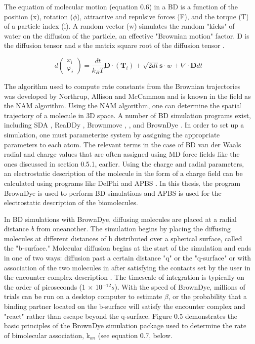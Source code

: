 \documentclass[12pt]{ucsddissertation}
\begin{document}
\begin{dissertationintroduction}
The equation of molecular motion (equation 0.6) in a BD is a function of the position (x), rotation ($\phi$), attractive and repulsive forces (F), and the torque (T) of a particle index (i). A random vector (w) simulates the random "kicks" of water on the diffusion of the particle, an effective "Brownian motion" factor. D is the diffusion tensor and s the matrix square root of the diffusion tensor \cite{Huber2010}. 

\begin{equation}
    d \left( \begin{array} { c } { x _ { i } } \\ { \varphi _ { i } } \end{array} \right) = \frac { d t } { k _ { B } T } \mathbf { D } \cdot \left( \mathbf { T } _ { i } \right) + \sqrt { 2 d t } \mathbf { s } \cdot w + \nabla \cdot \mathbf { D } d t
\end{equation}

The algorithm used to compute rate constants from the Brownian trajectories was developed by Northrup, Allison and McCammon \cite{Northrup1984} and is known in the field as the NAM algorithm. Using the NAM algorithm, one can determine the spatial trajectory of a molecule in 3D space. A number of BD simulation programs exist, including SDA \cite{Gabdoulline1997,Gabdoulline1998}, ReaDDy \cite{Schoneberg2013}, Brownmove \cite{Geyer2011},  \cite{Dlugosz2011}, and  BrownDye \cite{Huber2010}. In order to set up a simulation, one must parameterize system by assigning the appropriate parameters to each atom. The relevant terms in the case of BD van der Waals radial and charge values that are often assigned using MD force fields like the ones discussed in  section 0.5.1, earlier. Using the charge and radial parameters, an electrostatic description of the molecule in the form of a charge field can be calculated using programs like DelPhi \cite{Honig1995} and APBS \cite{Baker2001}. In this thesis, the program BrownDye is used to perform BD simulations and APBS is used for the electrostatic description of the biomolecules. 

In BD simulations with BrownDye, diffusing molecules are placed at a radial distance \textit{b} from oneanother. The simulation begins by placing the diffusing molecules at different distances of b distributed over a spherical surface, called the "b-surface." Molecular diffusion begins at the start of the simulation and ends in one of two ways: diffusion past a certain distance "q" or the "q-surface" or with association of the two molecules in after satisfying the contacts set by the user in the encounter complex description \cite{Huber2010}. The timescale of integration is typically on the order of picoseconds (1 $\times$ 10$^{-12}s$). With the speed of BrownDye, millions of trials can be run on a desktop computer to estimate $\beta$, or the probability that a binding partner located on the b-surface will satisfy the encounter complex and "react" rather than escape beyond the q-surface. Figure 0.5 demonstrates the basic principles of the BrownDye simulation package used to determine the rate of bimolecular association, k$_{on}$ (see equation 0.7, below.


\end{dissertationintroduction}
\end{document}
